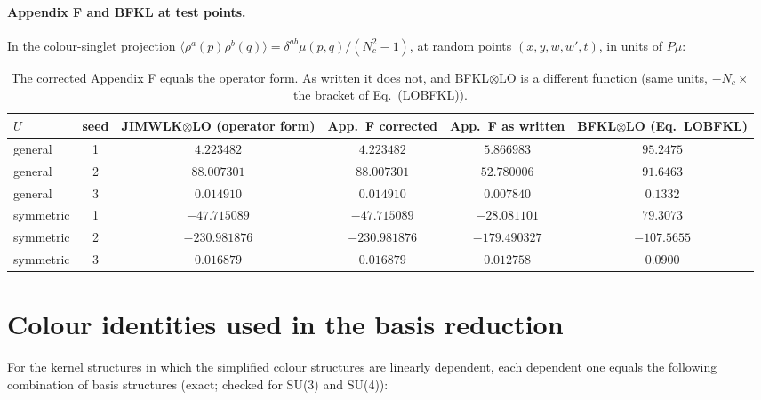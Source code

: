 \documentclass[10pt]{article}
\numberwithin{equation}{section}
\begin{document}
\paragraph{Appendix F and BFKL at test points.} In the colour-singlet projection $\langle\rho^a(p)\rho^b(q)\rangle=\delta^{ab}\mu(p,q)/(N_c^2-1)$, at random points $(x,y,w,w',t)$, in units of $P\mu$:
\begin{table}[h]
\centering\small
\begin{tabular}{@{}l c c c c c@{}}
$U$ & seed & JIMWLK$\otimes$LO (operator form) & App.\ F corrected & App.\ F as written & BFKL$\otimes$LO (Eq.~LOBFKL)\\ \hline
general & 1 & $4.223482$ & $4.223482$ & $5.866983$ & $95.2475$\\
general & 2 & $88.007301$ & $88.007301$ & $52.780006$ & $91.6463$\\
general & 3 & $0.014910$ & $0.014910$ & $0.007840$ & $0.1332$\\
symmetric & 1 & $-47.715089$ & $-47.715089$ & $-28.081101$ & $79.3073$\\
symmetric & 2 & $-230.981876$ & $-230.981876$ & $-179.490327$ & $-107.5655$\\
symmetric & 3 & $0.016879$ & $0.016879$ & $0.012758$ & $0.0900$\\
\end{tabular}
\caption{The corrected Appendix F equals the operator form. As written it does not, and BFKL$\otimes$LO is a different function (same units, $-N_c\times$ the bracket of Eq.~(LOBFKL)).}
\label{tab:appF}
\end{table}

\appendix
\section{Colour identities used in the basis reduction}\label{app:rel}
For the kernel structures in which the simplified colour structures are linearly dependent, each dependent one equals the following combination of basis structures (exact; checked for SU(3) and SU(4)):
\end{document}
